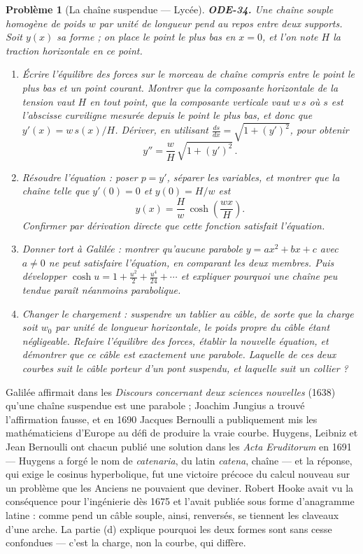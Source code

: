 \documentclass[11pt]{article}
\newtheorem{problem}{Problème}
\begin{document}
\bigskip

\begin{problem}[{La chaîne suspendue --- Lycée}]
\textbf{ODE-34.} Une chaîne souple homogène de poids $ w $ par unité de longueur pend au
repos entre deux supports. Soit $ y(x) $ sa forme ; on place le point le plus bas en
$ x = 0 $, et l'on note $ H $ la traction horizontale en ce point.
\begin{enumerate}
\item[(a)] Écrire l'équilibre des forces sur le morceau de chaîne compris entre le point le plus bas
et un point courant. Montrer que la composante horizontale de la tension vaut $ H $ en tout
point, que la composante verticale vaut $ w\,s $ où $ s $ est l'abscisse curviligne mesurée
depuis le point le plus bas, et donc que $ y'(x) = w\,s(x)/H $. Dériver, en utilisant
$ \frac{ds}{dx} = \sqrt{1 + (y')^2} $, pour obtenir
\[ y'' = \frac{w}{H}\,\sqrt{1 + (y')^2}\,. \]
\item[(b)] Résoudre l'équation : poser $ p = y' $, séparer les variables, et montrer que la chaîne
telle que $ y'(0) = 0 $ et $ y(0) = H/w $ est
\[ y(x) = \frac{H}{w}\,\cosh\!\left( \frac{w x}{H} \right). \]
Confirmer par dérivation directe que cette fonction satisfait l'équation.
\item[(c)] Donner tort à Galilée : montrer qu'aucune parabole $ y = ax^2 + bx + c $ avec $ a \ne 0 $
ne peut satisfaire l'équation, en comparant les deux membres. Puis développer
$ \cosh u = 1 + \frac{u^2}{2} + \frac{u^4}{24} + \cdots $ et expliquer pourquoi une chaîne peu
tendue paraît néanmoins parabolique.
\item[(d)] Changer le chargement : suspendre un tablier au câble, de sorte que la charge soit $ w_0 $
par unité de longueur \textit{horizontale}, le poids propre du câble étant négligeable. Refaire
l'équilibre des forces, établir la nouvelle équation, et démontrer que ce câble est exactement
une parabole. Laquelle de ces deux courbes suit le câble porteur d'un pont suspendu, et laquelle
suit un collier ?
\end{enumerate}

\end{problem}

\noindent Galilée affirmait dans les \textit{Discours concernant deux sciences nouvelles}
(1638) qu'une chaîne suspendue est une parabole ; Joachim Jungius a trouvé l'affirmation fausse,
et en 1690 Jacques Bernoulli a publiquement mis les mathématiciens d'Europe au défi de produire
la vraie courbe. Huygens, Leibniz et Jean Bernoulli ont chacun publié une solution dans les
\textit{Acta Eruditorum} en 1691 --- Huygens a forgé le nom de \textit{catenaria}, du latin
\textit{catena}, chaîne --- et la réponse, qui exige le cosinus hyperbolique, fut une victoire
précoce du calcul nouveau sur un problème que les Anciens ne pouvaient que deviner. Robert Hooke
avait vu la conséquence pour l'ingénierie dès 1675 et l'avait publiée sous forme d'anagramme
latine : comme pend un câble souple, ainsi, renversés, se tiennent les claveaux d'une arche. La
partie (d) explique pourquoi les deux formes sont sans cesse confondues --- c'est la charge, non la
courbe, qui diffère.
\end{document}
